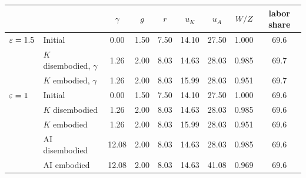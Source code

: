 \begin{tabular}{llccccccc}\toprule
 & & $\gamma$ & $g$ & $r$ & $u_K$ & $u_A$ & $W/Z$ & labor share\\\midrule
$\varepsilon=1.5$ & Initial & 0.00 & 1.50 & 7.50 & 14.10 & 27.50 & 1.000 & 69.6\\
 & $K$ disembodied, $\gamma$ & 1.26 & 2.00 & 8.03 & 14.63 & 28.03 & 0.985 & 69.7\\
 & $K$ embodied, $\gamma$ & 1.26 & 2.00 & 8.03 & 15.99 & 28.03 & 0.951 & 69.7\\
\midrule
$\varepsilon=1$ & Initial & 0.00 & 1.50 & 7.50 & 14.10 & 27.50 & 1.000 & 69.6\\
 & $K$ disembodied & 1.26 & 2.00 & 8.03 & 14.63 & 28.03 & 0.985 & 69.6\\
 & $K$ embodied & 1.26 & 2.00 & 8.03 & 15.99 & 28.03 & 0.951 & 69.6\\
 & AI disembodied & 12.08 & 2.00 & 8.03 & 14.63 & 28.03 & 0.985 & 69.6\\
 & AI embodied & 12.08 & 2.00 & 8.03 & 14.63 & 41.08 & 0.969 & 69.6\\
\bottomrule\end{tabular}
